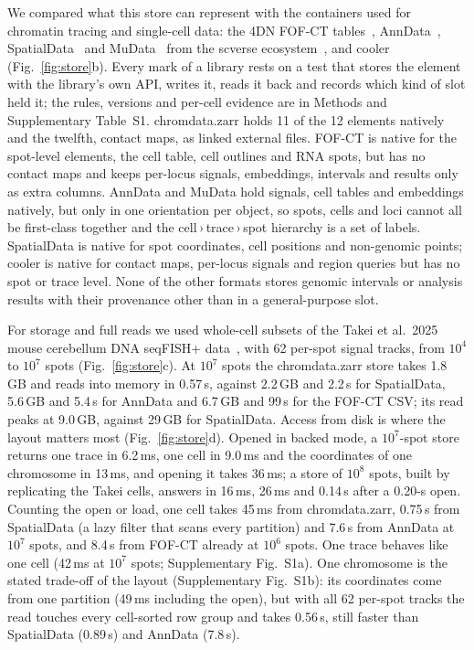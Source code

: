 \documentclass[11pt]{article}
\begin{document}
We compared what this store can represent with the containers used for chromatin tracing and single-cell data: the 4DN FOF-CT tables~\citep{fofct}, AnnData~\citep{anndata}, SpatialData~\citep{spatialdata} and MuData~\citep{mudata} from the scverse ecosystem~\citep{scverse}, and cooler~\citep{cooler} (Fig.~\ref{fig:store}b).
Every mark of a library rests on a test that stores the element with the library's own API, writes it, reads it back and records which kind of slot held it; the rules, versions and per-cell evidence are in Methods and Supplementary Table~S1.
chromdata.zarr holds 11 of the 12 elements natively and the twelfth, contact maps, as linked external files.
FOF-CT is native for the spot-level elements, the cell table, cell outlines and RNA spots, but has no contact maps and keeps per-locus signals, embeddings, intervals and results only as extra columns.
AnnData and MuData hold signals, cell tables and embeddings natively, but only in one orientation per object, so spots, cells and loci cannot all be first-class together and the cell\,›\,trace\,›\,spot hierarchy is a set of labels.
SpatialData is native for spot coordinates, cell positions and non-genomic points; cooler is native for contact maps, per-locus signals and region queries but has no spot or trace level.
None of the other formats stores genomic intervals or analysis results with their provenance other than in a general-purpose slot.

For storage and full reads we used whole-cell subsets of the Takei et al.\ 2025 mouse cerebellum DNA seqFISH+ data~\citep{takei2025}, with 62 per-spot signal tracks, from $10^{4}$ to $10^{7}$ spots (Fig.~\ref{fig:store}c).
At $10^{7}$ spots the chromdata.zarr store takes 1.8\,GB and reads into memory in 0.57\,s, against 2.2\,GB and 2.2\,s for SpatialData, 5.6\,GB and 5.4\,s for AnnData and 6.7\,GB and 99\,s for the FOF-CT CSV; its read peaks at 9.0\,GB, against 29\,GB for SpatialData.
Access from disk is where the layout matters most (Fig.~\ref{fig:store}d).
Opened in backed mode, a $10^{7}$-spot store returns one trace in 6.2\,ms, one cell in 9.0\,ms and the coordinates of one chromosome in 13\,ms, and opening it takes 36\,ms; a store of $10^{8}$ spots, built by replicating the Takei cells, answers in 16\,ms, 26\,ms and 0.14\,s after a 0.20-s open.
Counting the open or load, one cell takes 45\,ms from chromdata.zarr, 0.75\,s from SpatialData (a lazy filter that scans every partition) and 7.6\,s from AnnData at $10^{7}$ spots, and 8.4\,s from FOF-CT already at $10^{6}$ spots.
One trace behaves like one cell (42\,ms at $10^{7}$ spots; Supplementary Fig.~S1a).
One chromosome is the stated trade-off of the layout (Supplementary Fig.~S1b): its coordinates come from one partition (49\,ms including the open), but with all 62 per-spot tracks the read touches every cell-sorted row group and takes 0.56\,s, still faster than SpatialData (0.89\,s) and AnnData (7.8\,s).
\end{document}

